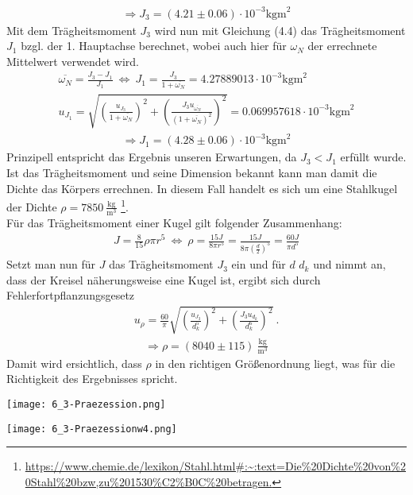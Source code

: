 \begin{align*}
    \Rightarrow\boxed{J_3=(4.21\pm0.06)\cdot10^{-3}\text{kgm}^2}
\end{align*}
Mit dem Trägheitsmoment $J_3$ wird nun mit Gleichung (4.4) das Trägheitsmoment $J_1$ bzgl. der 1. Hauptachse berechnet, wobei auch hier für $\omega_N$ der errechnete Mittelwert verwendet wird.
\begin{gather}
    \overline{\omega_N}=\frac{J_3-J_1}{J_1}~\Leftrightarrow~ J_1=\frac{J_3}{1+\overline{\omega_N}}=4.27889013\cdot 10^{-3}\text{kgm}^2\\
    u_{J_1}=\sqrt{\left(\frac{u_{J_3}}{1+\overline{\omega_N}}\right)^2+\left(\frac{J_3u_{\overline{\omega_N}}}{(1+\overline{\omega_N})^2}\right)^2}=0.069957618\cdot 10^{-3}\text{kgm}^2
\end{gather}
\begin{align*}
    \Rightarrow\boxed{J_1=(4.28\pm0.06)\cdot10^{-3}\text{kgm}^2}
\end{align*}
Prinzipell entspricht das Ergebnis unseren Erwartungen, da $J_3<J_1$ erfüllt wurde. Ist das Trägheitsmoment und seine Dimension bekannt kann man damit die Dichte das Körpers errechnen. In diesem Fall handelt es sich um eine Stahlkugel der Dichte $\rho = 7850~\frac{\text{kg}}{\text{m}^3}$ \footnote[5]{\url{https://www.chemie.de/lexikon/Stahl.html#:~:text=Die%20Dichte%20von%20Stahl%20bzw,zu%201530%C2%B0C%20betragen.}}.\\
Für das Trägheitsmoment einer Kugel gilt folgender Zusammenhang:
\begin{gather}
    J=\frac{8}{15}\rho\pi r^5 ~\Leftrightarrow~ \rho=\frac{15 J}{8\pi r^5}=\frac{15 J}{8\pi \left(\frac{d}{2}\right)^5} = \frac{60 J}{\pi d^5}
\end{gather}
Setzt man nun für $J$ das Trägheitsmoment $J_3$ ein und für $d$ $d_k$ und nimmt an, dass der Kreisel näherungsweise eine Kugel ist, ergibt sich durch Fehlerfortpflanzungsgesetz
\begin{gather}
    u_\rho = \frac{60}{\pi}\sqrt{\left(\frac{u_{J_3}}{d_k^5}\right)^2 + \left(\frac{J_3 u_{d_k}}{d_k^6}\right)^2}~.
\end{gather}
\begin{align*}
    \Rightarrow\boxed{\rho=(8040\pm115)~\frac{\text{kg}}{\text{m}^3}}
\end{align*}
Damit wird ersichtlich, dass $\rho$ in den richtigen Größenordnung liegt, was für die Richtigkeit des Ergebnisses spricht.
\newpage
\begin{center}
    \texttt{[image: 6\_3-Praezession.png]}
\end{center}
\newpage
\begin{center}
    \texttt{[image: 6\_3-Praezessionw4.png]}
\end{center}

